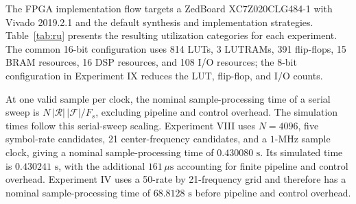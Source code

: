 The FPGA implementation flow targets a ZedBoard XC7Z020CLG484-1 with Vivado 2019.2.1 and the default synthesis and implementation strategies.  Table~\ref{tab:ru} presents the resulting utilization categories for each experiment.  The common 16-bit configuration uses 814 LUTs, 3 LUTRAMs, 391 flip-flops, 15 BRAM resources, 16 DSP resources, and 108 I/O resources; the 8-bit configuration in Experiment IX reduces the LUT, flip-flop, and I/O counts.

At one valid sample per clock, the nominal sample-processing time of a serial sweep is $N\,|\mathcal{R}|\,|\mathcal{F}|/F_s$, excluding pipeline and control overhead.  The simulation times follow this serial-sweep scaling.  Experiment VIII uses $N=4096$, five symbol-rate candidates, 21 center-frequency candidates, and a $1\text{-MHz}$ sample clock, giving a nominal sample-processing time of $0.430080\text{ s}$.  Its simulated time is $0.430241\text{ s}$, with the additional $161\,\mu\text{s}$ accounting for finite pipeline and control overhead.  Experiment IV uses a 50-rate by 21-frequency grid and therefore has a nominal sample-processing time of $68.8128\text{ s}$ before pipeline and control overhead.

